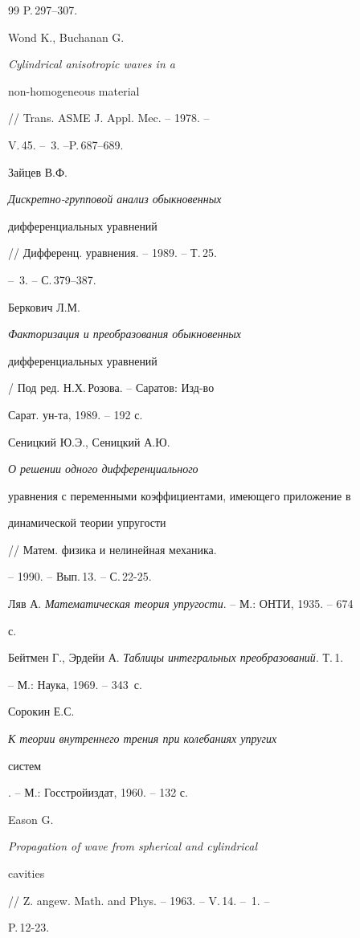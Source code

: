 \begin{thebibliography}{99}
P.\,297--307. 




Wond K., Buchanan G. {\em Cylindrical anisotropic waves in a 


non-homogeneous material} // Trans. ASME J. Appl. Mec. -- 1978. -- 


V.\,45. -- \No\,3. --P.\,687--689. 




Зайцев В.Ф. {\em Дискретно-групповой анализ обыкновенных 


дифференциальных уравнений} // Дифференц. уравнения. -- 1989. -- Т.\,25. 


-- \No\,3. -- С.\,379--387. 




Беркович Л.М. {\em Факторизация и преобразования обыкновенных 


дифференциальных уравнений} / Под ред. Н.Х.\,Розова. -- Саратов: Изд-во 


Сарат. ун-та, 1989. -- 192 с. 




Сеницкий Ю.Э., Сеницкий А.Ю. {\em О решении одного дифференциального 


уравнения с переменными коэффициентами, имеющего приложение в 


динамической теории упругости} // Матем. физика и нелинейная механика. 


-- 1990. -- Вып.\,13. -- С.\,22-25. 




Ляв А. {\em Математическая теория упругости}. -- М.: ОНТИ, 1935. -- 674 


с. 




Бейтмен Г., Эрдейи А. {\em Таблицы интегральных преобразований}. Т.\,1. 


-- М.: Наука, 1969. -- 343~с. 




Сорокин Е.С. {\em К теории внутреннего трения при колебаниях упругих 


систем}. -- М.: Госстройиздат, 1960. -- 132 с. 




Eason G. {\em Propagation of wave from spherical and cylindrical 


cavities} // Z. angew. Math. and Phys. -- 1963. -- V.\,14. -- \No\,1. -- 


P.\,12-23. 


 


 


\end{thebibliography} 


 


\vskip 2cm 


 






 


\label{end} 


 


